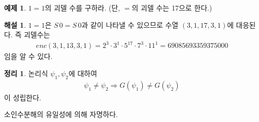 \documentclass[b5paper, 11pt]{book}
\theoremstyle{definition}
\newtheorem{thm}[defn]{정리}
\newtheorem{ex}[defn]{예제}
\newtheorem*{ans*}{해설}
\newenvironment{pf*}{\pushQED{\qed}\pf}
{\popQED\endpf}
\begin{document}
\begin{ex}
    $1 = 1$의 괴델 수를 구하라. (단, $=$의 괴델 수는 17으로 한다.) 
\end{ex}
\begin{ans*}
    $1 = 1$은 $S\, 0 = S\, 0$과 같이 나타낼 수 있으므로 수열 $(3, 1, 17, 3, 1)$에 대응된다. 즉 괴델수는 
    \begin{align*}
        enc(3, 1, 13, 3, 1) = 2^3 \cdot 3^1 \cdot 5^{17} \cdot 7^3 \cdot 11^1 = 69085693359375000
    \end{align*}
    임을 알 수 있다.
\end{ans*}
\begin{thm}
    논리식 $\psi_1, \psi_2$에 대하여
    \begin{align*}
        \psi_1 \neq \psi_2 \Rightarrow G(\psi_1) \neq G(\psi_2)
    \end{align*}
    이 성립한다. 
\end{thm}
\begin{pf*}
    소인수분해의 유일성에 의해 자명하다.
\end{pf*}
\end{document}
